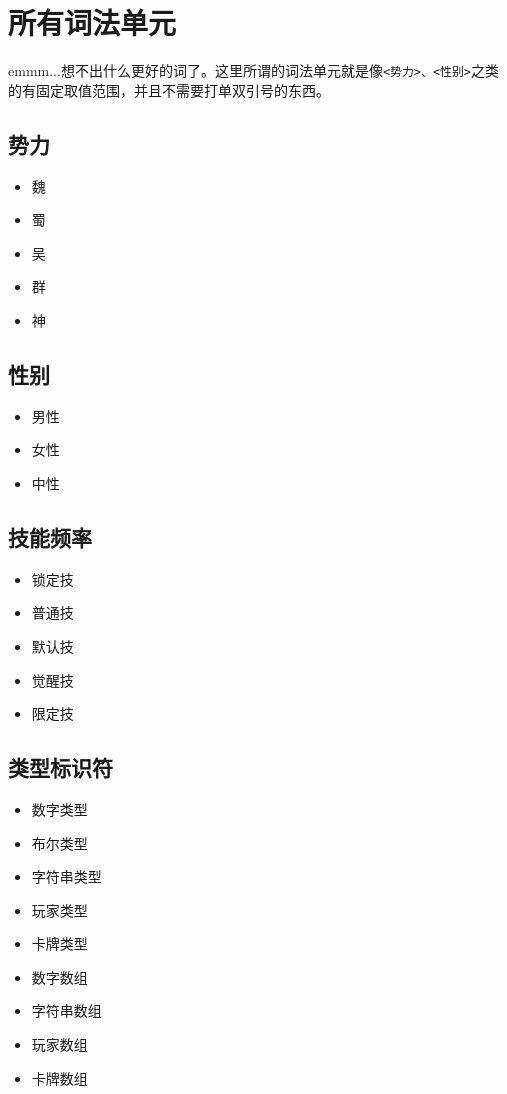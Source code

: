 \chapter{所有词法单元}

emmm...想不出什么更好的词了。这里所谓的词法单元就是像\verb|<势力>、<性别>|之类的有固定取值范围，并且不需要打单双引号的东西。

\section{势力}

\begin{itemize}
 \item 魏
 \item 蜀
 \item 吴
 \item 群
 \item 神
\end{itemize}

\section{性别}

\begin{itemize}
 \item 男性
 \item 女性
 \item 中性
\end{itemize}

\section{技能频率}

\begin{itemize}
 \item 锁定技
 \item 普通技
 \item 默认技
 \item 觉醒技
 \item 限定技
\end{itemize}

\section{类型标识符}

\begin{itemize}
 \item 数字类型
 \item 布尔类型
 \item 字符串类型
 \item 玩家类型
 \item 卡牌类型
 \item 数字数组
 \item 字符串数组
 \item 玩家数组
 \item 卡牌数组
\end{itemize}
